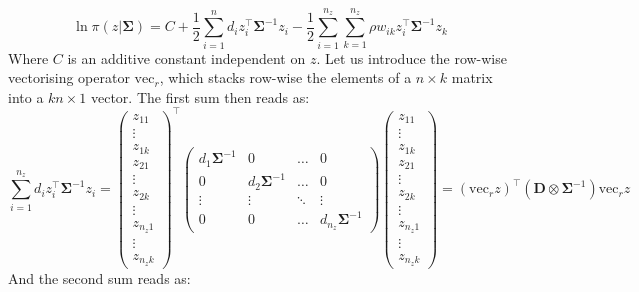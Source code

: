 \documentclass{article}
\begin{document}
$$
\ln \pi(z \vert \boldsymbol{\Sigma}) = C + \frac{1}{2}\sum_{i=1}^{n} d_i z_i ^{\top} \boldsymbol{\Sigma}^{-1} z_i -
\frac{1}{2}\sum_{i=1}^{n_z} \sum_{k=1}^{n_z}\rho w_{ik} z_i^{\top} \boldsymbol{\Sigma}^{-1} z_k
$$
%
Where $C$ is an additive constant independent on $z$. Let us introduce the row-wise vectorising operator $\mathrm{vec}_r$, which stacks row-wise the elements of a $n \times k$ matrix into a $kn \times 1$ vector. The first sum then reads as:
$$
 \sum_{i=1}^{n_z} d_i z^{\top}_i \boldsymbol{\Sigma}^{-1} z_i = 
\begin{pmatrix}
z_{11} \\ \vdots \\ z_{1k} \\ z_{21} \\ \vdots \\ z_{2k} \\ \vdots \\z_{n_z1} \\ \vdots \\ z_{n_zk}
\end{pmatrix}^{\top}
\begin{pmatrix}
d_1 \boldsymbol{\Sigma}^{-1} & 0 & \ldots & 0 \\
0 & d_2 \boldsymbol{\Sigma}^{-1} & \ldots & 0 \\
\vdots & \vdots & \ddots & \vdots \\
0 & 0 & \ldots & d_{n_z} \boldsymbol{\Sigma}^{-1}
\end{pmatrix}
\begin{pmatrix}
z_{11} \\ \vdots \\ z_{1k} \\ z_{21} \\ \vdots \\ z_{2k} \\ \vdots \\z_{n_z1} \\ \vdots \\ z_{n_zk}
\end{pmatrix}  = 
(\mathrm{vec}_rz) ^{\top} (\boldsymbol{D} \otimes \boldsymbol{\Sigma}^{-1}) \mathrm{vec}_r z
$$
And the second sum reads as:
\end{document}
